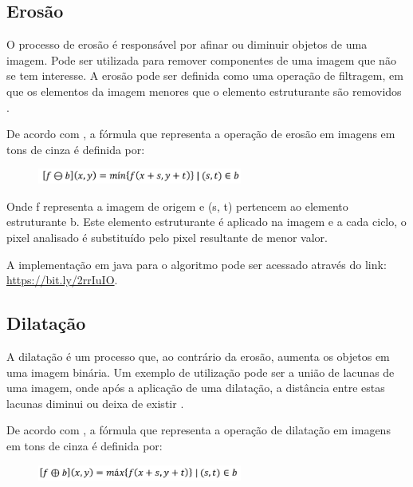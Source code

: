 \documentclass[
	12pt,				%
	oneside,			%
	a4paper,			%
	english,			%
	french,				%
	spanish,			%
	brazil,				%
	]{abntex2}
\begin{document}
\subsection{Erosão}
O processo de erosão é responsável por afinar ou diminuir objetos de uma imagem. Pode ser utilizada para remover componentes de uma imagem que não se tem interesse. A erosão pode ser definida como uma operação de filtragem, em que os elementos da imagem menores que o elemento estruturante são removidos \cite{gonzalesWoods:2008}.

De acordo com \citet{pedriniSchwartz:2008}, a fórmula que representa a operação de erosão em imagens em tons de cinza é definida por:

\begin{figure}[ht]
\centering
\includegraphics[width=0.6\textwidth]{imagens/erosao_formula.png}
\end{figure}

Onde f representa a imagem de origem e (s, t) pertencem ao elemento estruturante b. Este elemento estruturante é aplicado na imagem e a cada ciclo, o pixel analisado é substituído pelo pixel resultante de menor valor.

A implementação em java para o algoritmo pode ser acessado através do link: \url{https://bit.ly/2rrIuIO}.

\subsection{Dilatação}

A dilatação é um processo que, ao contrário da erosão, aumenta os objetos em uma imagem binária. Um exemplo de utilização pode ser a união de lacunas de uma imagem, onde após a aplicação de uma dilatação, a distância entre estas lacunas diminui ou deixa de existir \cite{gonzalesWoods:2008}. 

De acordo com \citet{pedriniSchwartz:2008}, a fórmula que representa a operação de dilatação em imagens em tons de cinza é definida por:

\begin{figure}[ht]
\centering
\includegraphics[width=0.6\textwidth]{imagens/dilatacao_formula.png}
\end{figure}
\end{document}
